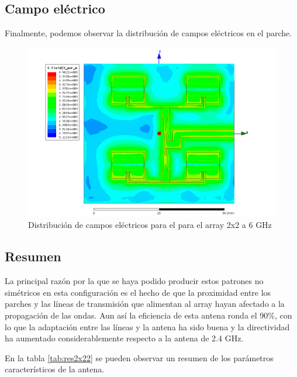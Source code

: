 \subsection{Campo eléctrico}
\par Finalmente, podemos observar la distribución de campos eléctricos en el parche. 

\begin{figure}[H]
    \centering
        \includegraphics[width=\textwidth]{archivos/analisis/2x22/8}
        \caption{Distribución de campos eléctricos para el para el array 2x2 a 6 GHz}
        \label{fig:elec2x22}
\end{figure}

\subsection{Resumen}
\par La principal razón por la que se haya podido producir estos patrones no simétricos en esta configuración es el hecho de que la proximidad entre los parches y las líneas de transmisión que alimentan al array hayan afectado a la propagación de las ondas. Aun así la eficiencia de esta antena ronda el 90\%, con lo que la adaptación entre las líneas y la antena ha sido buena y la directividad ha aumentado considerablemente respecto a la antena de 2.4 GHz.
\\
\par En la tabla \ref{tab:res2x22} se pueden observar un resumen de los parámetros característicos de la antena.

